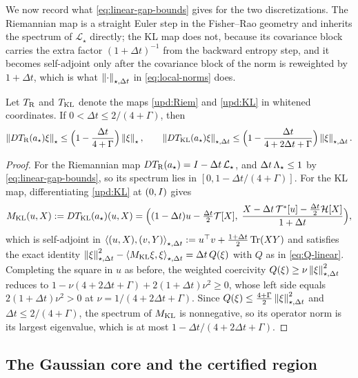 We now record what \eqref{eq:linear-gap-bounds} gives for the two discretizations. The
Riemannian map is a straight Euler step in the Fisher--Rao geometry and inherits the spectrum
of $\mathcal L_\star$ directly; the KL map does not, because its covariance block carries the
extra factor $(1+\Delta t)^{-1}$ from the backward entropy step, and it becomes self-adjoint
only after the covariance block of the norm is reweighted by $1+\Delta t$, which is what
$\left\lVert \cdot\right\rVert_{\star,\Delta t}$ in \eqref{eq:local-norms} does.

\begin{proposition}
\label{prop:linearized-maps}
Let $T_{\mathrm{R}}$ and $T_{\mathrm{KL}}$ denote the maps \eqref{upd:Riem} and \eqref{upd:KL} in whitened
coordinates. If $0<\Delta t\leq2/(4+\Gamma)$, then
\[
    \left\lVert DT_{\mathrm{R}}(a_\star)\xi\right\rVert_\star\leq\Bigl(1-\frac{\Delta t}{4+\Gamma}\Bigr)\left\lVert \xi\right\rVert_\star,
    \qquad
    \left\lVert DT_{\mathrm{KL}}(a_\star)\xi\right\rVert_{\star,\Delta t}\leq\Bigl(1-\frac{\Delta t}{4+2\Delta t+\Gamma}\Bigr)\left\lVert \xi\right\rVert_{\star,\Delta t}.
\]
\end{proposition}

\begin{proof}
For the Riemannian map $DT_{\mathrm{R}}(a_\star)=I-\Delta t\,\mathcal L_\star$, and
$\Delta t\,\Lambda_\star\leq1$ by \eqref{eq:linear-gap-bounds}, so its spectrum lies in
$[0,1-\Delta t/(4+\Gamma)]$. For the KL map, differentiating \eqref{upd:KL} at $(0,I)$ gives
\[
    M_{\mathrm{KL}}(u,X):=DT_{\mathrm{KL}}(a_\star)(u,X)
    =\Bigl((1-\Delta t)u-\tfrac{\Delta t}2\mathcal T[X],\;
    \frac{X-\Delta t\,\mathcal T^*[u]-\tfrac{\Delta t}2\mathcal H[X]}{1+\Delta t}\Bigr),
\]
which is self-adjoint in
$\left\langle (u,X),(v,Y)\right\rangle_{\star,\Delta t}:=u^\top v+\tfrac{1+\Delta t}2\operatorname{Tr}(XY)$ and satisfies the
exact identity
$\left\lVert \xi\right\rVert_{\star,\Delta t}^2-\left\langle M_{\mathrm{KL}}\xi,\xi\right\rangle_{\star,\Delta t}=\Delta t\,Q(\xi)$ with $Q$
as in \eqref{eq:Q-linear}. Completing the square in $u$ as before, the weighted coercivity
$Q(\xi)\geq\nu\left\lVert \xi\right\rVert_{\star,\Delta t}^2$ reduces to
$1-\nu(4+2\Delta t+\Gamma)+2(1+\Delta t)\nu^2\geq0$, whose left side equals
$2(1+\Delta t)\nu^2>0$ at $\nu=1/(4+2\Delta t+\Gamma)$. Since
$Q(\xi)\leq\tfrac{4+\Gamma}2\left\lVert \xi\right\rVert_{\star,\Delta t}^2$ and $\Delta t\leq2/(4+\Gamma)$, the
spectrum of $M_{\mathrm{KL}}$ is nonnegative, so its operator norm is its largest eigenvalue, which is at
most $1-\Delta t/(4+2\Delta t+\Gamma)$.
\end{proof}

\subsection{The Gaussian core and the certified region}
\label{subsec:core}

